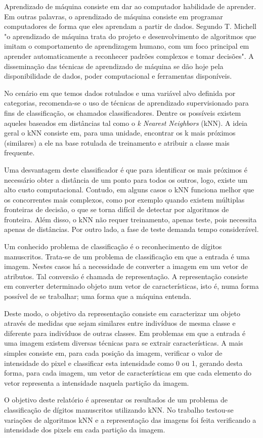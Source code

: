 
Aprendizado de máquina consiste em dar ao computador habilidade de aprender. Em outras palavras, o aprendizado de máquina consiste em programar computadores de forma que eles aprendam a partir de dados. Segundo T. Michell "o aprendizado de máquina trata do projeto e desenvolvimento de algoritmos que imitam o comportamento de aprendizagem humano, com um foco principal em aprender automaticamente a reconhecer padrões complexos e tomar decisões". A disseminação das técnicas de aprendizado de máquina se dão hoje pela disponibilidade de dados, poder computacional e ferramentas disponíveis.

No cenário em que temos dados rotulados e uma variável alvo definida por categorias, recomenda-se o uso de técnicas de aprendizado supervisionado para fins de classificação, os chamados classificadores. Dentre os possíveis existem aqueles baseados em distâncias tal como o \emph{k Nearest Neighbors} (kNN). A ideia geral o kNN consiste em, para uma unidade, encontrar os k mais próximos (similares) a ele na base rotulada de treinamento e atribuir a classe mais frequente.

Uma desvantagem deste classificador é que para identificar os mais próximos é necessário obter a distância de um ponto para todos os outros, logo, existe um alto custo computacional. Contudo, em alguns casos o kNN funciona melhor que os concorrentes mais complexos, como por exemplo quando existem múltiplas fronteiras de decisão, o que se torna difícil de detectar por algoritmos de fronteira. Além disso, o kNN não requer treinamento, apenas teste, pois necessita apenas de distâncias. Por outro lado, a fase de teste demanda tempo considerável.

Um conhecido problema de classificação é o reconhecimento de dígitos manuscritos. Trata-se de um problema de classificação em que a entrada é uma imagem. Nestes casos há a necessidade de converter a imagem em um vetor de atributos. Tal conversão é chamada de representação. A representação consiste em converter determinado objeto num vetor de características, isto é, numa forma possível de se trabalhar; uma forma que a máquina entenda.

Deste modo, o objetivo da representação consiste em caracterizar um objeto através de medidas que sejam similares entre indivíduos de mesma classe e diferente para indivíduos de outras classes. Em problemas em que a entrada é uma imagem existem diversas técnicas para se extrair características. A mais simples consiste em, para cada posição da imagem, verificar o valor de intensidade do pixel e classificar esta intensidade como 0 ou 1, gerando desta forma, para cada imagem, um vetor de características em que cada elemento do vetor representa a intensidade naquela partição da imagem.

O objetivo deste relatório é apresentar os resultados de um problema de classificação de dígitos manuscritos utilizando kNN. No trabalho testou-se variações de algoritmos kNN e a representação das imagens foi feita verificando a intensidade dos pixels em cada partição da imagem.
